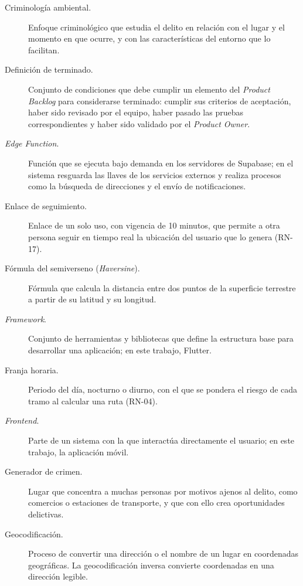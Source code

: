 \begin{description}
    \item[Criminología ambiental.] Enfoque criminológico que estudia el delito en relación con el lugar y el momento en que ocurre, y con las características del entorno que lo facilitan.

    \item[Definición de terminado.] Conjunto de condiciones que debe cumplir un elemento del \textit{Product Backlog} para considerarse terminado: cumplir sus criterios de aceptación, haber sido revisado por el equipo, haber pasado las pruebas correspondientes y haber sido validado por el \textit{Product Owner}.

    \item[\textit{Edge Function}.] Función que se ejecuta bajo demanda en los servidores de Supabase; en el sistema resguarda las llaves de los servicios externos y realiza procesos como la búsqueda de direcciones y el envío de notificaciones.

    \item[Enlace de seguimiento.] Enlace de un solo uso, con vigencia de 10 minutos, que permite a otra persona seguir en tiempo real la ubicación del usuario que lo genera (RN-17).

    \item[Fórmula del semiverseno (\textit{Haversine}).] Fórmula que calcula la distancia entre dos puntos de la superficie terrestre a partir de su latitud y su longitud.

    \item[\textit{Framework}.] Conjunto de herramientas y bibliotecas que define la estructura base para desarrollar una aplicación; en este trabajo, Flutter.

    \item[Franja horaria.] Periodo del día, nocturno o diurno, con el que se pondera el riesgo de cada tramo al calcular una ruta (RN-04).

    \item[\textit{Frontend}.] Parte de un sistema con la que interactúa directamente el usuario; en este trabajo, la aplicación móvil.

    \item[Generador de crimen.] Lugar que concentra a muchas personas por motivos ajenos al delito, como comercios o estaciones de transporte, y que con ello crea oportunidades delictivas.

    \item[Geocodificación.] Proceso de convertir una dirección o el nombre de un lugar en coordenadas geográficas. La geocodificación inversa convierte coordenadas en una dirección legible.


\end{description}

